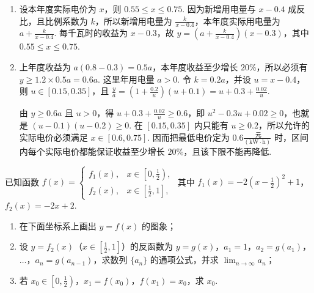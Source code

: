 \begin{solution}
\begin{enumerate}
\item 设本年度实际电价为 \(x\)，则 \(0.55\leq x\leq0.75\). 因为新增用电量与 \(x-0.4\) 成反比，且比例系数为 \(k\)，所以新增用电量为 \(\frac{k}{x-0.4}\)，本年度实际用电量为 \(a+\frac{k}{x-0.4}\). 每千瓦时的收益为 \(x-0.3\)，故 \(y=\left(a+\frac{k}{x-0.4}\right)(x-0.3)\)，其中 \(0.55\leq x\leq0.75\).

\item 上年度收益为 \(a(0.8-0.3)=0.5a\)，本年度收益至少增长 \(20\%\)，所以必须有 \(y\geq1.2\times0.5a=0.6a\). 这里年用电量 \(a>0\). 令 \(k=0.2a\)，并设 \(u=x-0.4\)，则 \(u\in[0.15,0.35]\)，且 \(\frac{y}{a}=\left(1+\frac{0.2}{u}\right)(u+0.1)=u+0.3+\frac{0.02}{u}\).

由 \(y\geq0.6a\) 且 \(u>0\)，得 \(u+0.3+\frac{0.02}{u}\geq0.6\)，即 \(u^{2}-0.3u+0.02\geq0\)，也就是 \((u-0.1)(u-0.2)\geq0\). 在 \([0.15,0.35]\) 内只能有 \(u\geq0.2\)，所以允许的实际电价必须满足 \(x\in[0.6,0.75]\). 因而把最低电价定为 \(0.6\frac{\text{ 元}}{(\mathrm{kW}\cdot\mathrm{h})}\) 时，区间内每个实际电价都能保证收益至少增长 \(20\%\)，且该下限不能再降低.
\end{enumerate}
\end{solution}

\begin{problem}
已知函数 \(f(x)=\begin{cases}
f_{1}(x),&x\in\left[0,\frac{1}{2}\right),\\
f_{2}(x),&x\in\left[\frac{1}{2},1\right],
\end{cases}\)
其中 \(f_{1}(x)=-2\left(x-\frac{1}{2}\right)^{2}+1\)，\(f_{2}(x)=-2x+2\).

\begin{enumerate}
\item 在下面坐标系上画出 \(y=f(x)\) 的图象；
\item 设 \(y=f_{2}(x)\)（\(x\in\left[\frac{1}{2},1\right]\)）的反函数为 \(y=g(x)\)，\(a_{1}=1\)，\(a_{2}=g(a_{1})\)，\(\dots\)，\(a_{n}=g(a_{n-1})\)，求数列 \(\{a_{n}\}\) 的通项公式，并求 \(\displaystyle\lim_{n\to\infty}a_{n}\)；
\item 若 \(x_{0}\in\left[0,\frac{1}{2}\right)\)，\(x_{1}=f(x_{0})\)，\(f(x_{1})=x_{0}\)，求 \(x_{0}\).
\end{enumerate}

\end{problem}

